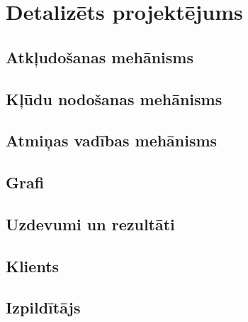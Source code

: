 \section{Detalizēts projektējums}
\subsection{Atkļudošanas mehānisms}
\subsection{Kļūdu nodošanas mehānisms}
\subsection{Atmiņas vadības mehānisms}
\subsection{Grafi}
\subsection{Uzdevumi un rezultāti}
\subsection{Klients}
\subsection{Izpildītājs}

